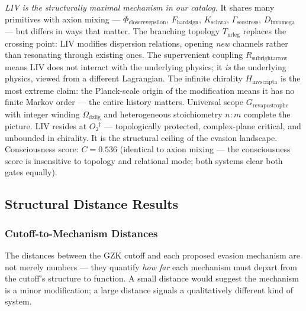 \documentclass[12pt,a4paper]{article}
\begin{document}
\emph{LIV is the structurally maximal mechanism in our catalog.} It shares many primitives with axion mixing --- $\Phi_{\text{closerevepsilon}}$, $F_{\text{hardsign}}$, $K_{\text{schwa}}$, $\Gamma_{\text{secstress}}$, $D_{\text{invomega}}$ --- but differs in ways that matter. The branching topology $T_{\text{nrleg}}$ replaces the crossing point: LIV modifies dispersion relations, opening \emph{new} channels rather than resonating through existing ones. The supervenient coupling $R_{\text{subrightarrow}}$ means LIV does not interact with the underlying physics; it \emph{is} the underlying physics, viewed from a different Lagrangian. The infinite chirality $H_{\text{invscripta}}$ is the most extreme claim: the Planck-scale origin of the modification means it has no finite Markov order --- the entire history matters. Universal scope $G_{\text{revapostrophe}}$ with integer winding $\Omega_{\text{dzlig}}$ and heterogeneous stoichiometry $n{:}m$ complete the picture. LIV resides at $O₂^\dagger$ --- topologically protected, complex-plane critical, and unbounded in chirality. It is the structural ceiling of the evasion landscape. Consciousness score: $C = 0.536$ (identical to axion mixing --- the consciousness score is insensitive to topology and relational mode; both systems clear both gates equally).

\subsection{Structural Distance Results}

\subsubsection{Cutoff-to-Mechanism Distances}

The distances between the GZK cutoff and each proposed evasion mechanism are not merely numbers --- they quantify \emph{how far} each mechanism must depart from the cutoff's structure to function. A small distance would suggest the mechanism is a minor modification; a large distance signals a qualitatively different kind of system.
\end{document}
